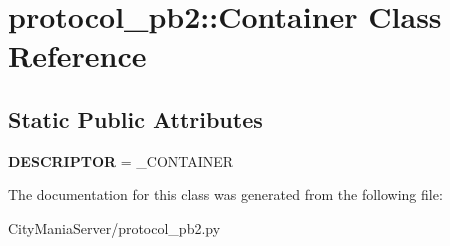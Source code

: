 \hypertarget{classprotocol__pb2_1_1Container}{
\section{protocol\_\-pb2::Container Class Reference}
\label{classprotocol__pb2_1_1Container}
}
\subsection*{Static Public Attributes}
\begin{DoxyCompactItemize}
\item 
\hypertarget{classprotocol__pb2_1_1Container_a0645908a3e02026c710147f91ba0af31}{
{\bfseries DESCRIPTOR} = \_\-CONTAINER}
\label{classprotocol__pb2_1_1Container_a0645908a3e02026c710147f91ba0af31}

\end{DoxyCompactItemize}


The documentation for this class was generated from the following file:\begin{DoxyCompactItemize}
\item 
CityManiaServer/protocol\_\-pb2.py\end{DoxyCompactItemize}
